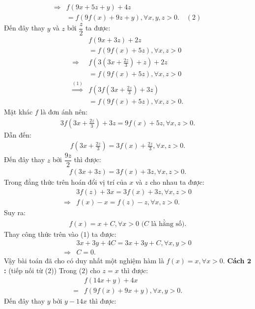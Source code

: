 \begin{multicols}{2}
\begin{align*}
		\Rightarrow &f(9x + 5z + y) + 4z \\
		&= f(9f(x) + 9z + y),\forall x,y,z > 0. \quad \!\!(2)
	\end{align*}
	Đến đây thay $y$  và $z$  bởi $\dfrac{z}{2}$  ta được: 
	\begin{align*}
		&f(9x + 3z) + 2z \\
		&= f(9f(x) + 5z),\forall x,z > 0\\
		\Rightarrow &f(3(3x + \frac{{2z}}{3}) + z) + 2z \\
		&= f(9f(x) + 5z),\forall x,z > 0\\
		\mathop\Rightarrow \limits^{(1)} &f(3f(3x + \frac{{2z}}{3}) + 3z) \\
		&= f(9f(x) + 5z),\forall x,z > 0.
	\end{align*}
	Mặt khác $f$  là đơn ánh nên: 
	\begin{align*}
		3f(3x + \frac{{2z}}{3}) + 3z = 9f(x) + 5z,\forall x,z > 0.
	\end{align*}
	Dẫn đến:
	\begin{align*}
		f(3x + \frac{{2z}}{3}) = 3f(x) + \frac{{2z}}{3},\forall x,z > 0.
	\end{align*}
	Đến đây thay $z$  bởi $\dfrac{9z}{2}$  thì được:
	\begin{align*}
		f(3x + 3z) = 3f(x) + 3z,\forall x,z > 0.
	\end{align*}
	Trong đẳng thức trên hoán đổi vị trí của $x$  và $z$ cho nhau ta được: 
	\begin{align*}
		&3f(z) + 3x = 3f(x) + 3z,\forall x,z > 0\\
		\Rightarrow &f(x) - x = f(z) - z,\forall x,z > 0.
	\end{align*}
	Suy ra: 
	\begin{align*}
		f(x) = x + C,\forall x > 0 \text{ ($C$ là hằng số).}
	\end{align*}
	Thay công thức trên vào ($1$) ta được: 
	\begin{align*}
		&3x + 3y + 4C = 3x + 3y + C,\forall x,y > 0 \\
		\Rightarrow &C = 0.
	\end{align*}
	Vậy bài toán đã cho có duy nhất một nghiệm hàm là $f(x) = x, \forall x >0$.
	\vskip 0.1cm
	\textbf{\color{hoccungpi}Cách $\pmb2$:} (tiếp nối từ ($2$))
	\vskip 0.1cm 
	Trong ($2$) cho $z = x$ thì được: 
	\begin{align*}
		&f(14x + y) + 4x \\
		= &f(9f(x) + 9x + y),\forall x,y > 0.
	\end{align*}
	Đến đây thay $y$  bởi $y - 14x$  thì được: 

\end{multicols}
